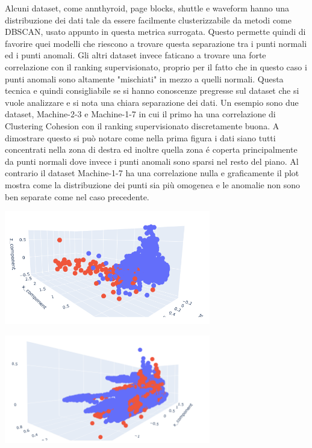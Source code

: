 Alcuni dataset, come annthyroid, page blocks, shuttle e waveform hanno una distribuzione dei dati tale da essere facilmente clusterizzabile da metodi come DBSCAN, usato appunto in questa metrica surrogata. Questo permette quindi di favorire quei modelli che riescono a trovare questa separazione tra i punti normali ed i punti anomali.
Gli altri dataset invece faticano a trovare una forte correlazione con il ranking supervisionato, proprio per il fatto che in questo caso i punti anomali sono altamente "mischiati" in mezzo a quelli normali.
Questa tecnica e quindi consigliabile se si hanno conoscenze pregresse sul dataset che si vuole analizzare e si nota una chiara separazione dei dati. Un esempio sono due dataset, Machine-2-3 e Machine-1-7 in cui il primo ha una correlazione di Clustering Cohesion con il ranking supervisionato discretamente buona. A dimostrare questo si può notare come nella prima figura i dati siano tutti concentrati nella zona di destra ed inoltre quella zona é coperta principalmente da punti normali dove invece i punti anomali sono sparsi nel resto del piano. 
Al contrario il dataset Machine-1-7 ha una correlazione nulla e graficamente il plot mostra come la distribuzione dei punti sia più omogenea e le anomalie non sono ben separate come nel caso precedente. 
\begin{center}
	\includegraphics[width=9cm, scale=1]{images/scatter_cluster_good}
    \captionsetup{type=figure}
\end{center}
\begin{center}
	\includegraphics[width=9cm, scale=1]{images/scatter_cluster}
    \captionsetup{type=figure}
\end{center}

